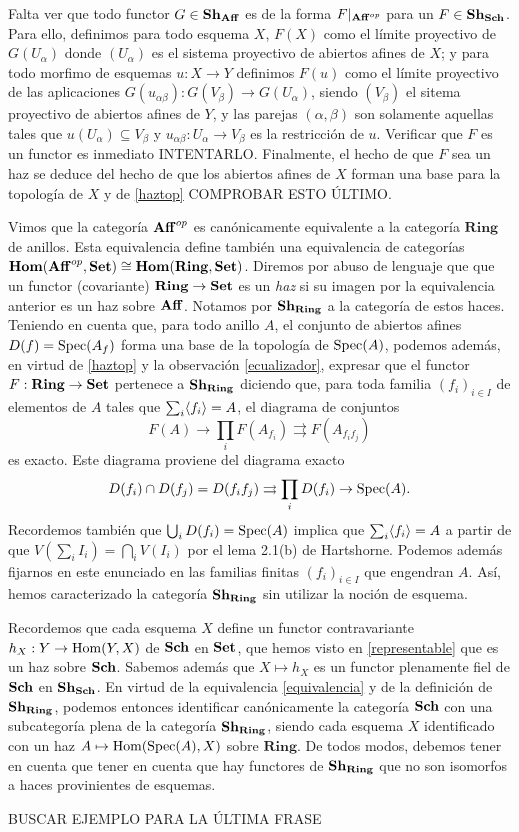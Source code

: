 \documentclass[twoside]{article}
\begin{document}
 Falta ver que todo functor $G\in\mathrm{\mathbf{Sh}}_{\mathrm{\mathbf{Aff}}}$ es de la forma $F|_{\mathrm{\mathbf{Aff}}^{op}}$ para un $F\in \mathrm{\mathbf{Sh}}_{\mathrm{\mathbf{Sch}}}$. Para ello, definimos para todo esquema $X$, $F(X)$ como el límite proyectivo de $G(U_\alpha)$ donde $(U_\alpha)$ es el sistema proyectivo de abiertos afines de $X$; y para todo morfimo de esquemas $u:X\to Y$ definimos $F(u)$ como el límite proyectivo de las aplicaciones $G(u_{\alpha\beta}):G(V_\beta)\to G(U_\alpha)$, siendo $(V_\beta)$ el sitema proyectivo de abiertos afines de $Y$, y las parejas $(\alpha,\beta)$ son solamente aquellas tales que $u(U_\alpha)\subseteq V_\beta$ y $u_{\alpha\beta}:U_\alpha\to V_\beta$ es la restricción de $u$. Verificar que $F$ es un functor es inmediato INTENTARLO. Finalmente, el hecho de que $F$ sea un haz se deduce del hecho de que los abiertos afines de $X$ forman una base para la topología de $X$ y de \ref{haztop} COMPROBAR ESTO ÚLTIMO.
 
 
 Vimos que la categoría $\mathrm{\mathbf{Aff}}^{op}$ es canónicamente equivalente a la categoría $\mathrm{\mathbf{Ring}}$ de anillos. Esta equivalencia define también una equivalencia de categorías $\mathrm{\mathbf{Hom}}(\mathrm{\mathbf{Aff}}^{op},\mathrm{\mathbf{Set}})\cong \mathrm{\mathbf{Hom}}(\mathrm{\mathbf{Ring}},\mathrm{\mathbf{Set}})$. Diremos por abuso de lenguaje que que un functor (covariante) $\mathrm{\mathbf{Ring}}\to\mathrm{\mathbf{Set}}$ es un \emph{haz} si su imagen por la equivalencia anterior es un haz sobre $\mathrm{\mathbf{Aff}}$. Notamos por $\mathrm{\mathbf{Sh}}_{\mathrm{\mathbf{Ring}}}$ a la categoría de estos haces. Teniendo en cuenta que, para todo anillo $A$, el conjunto de abiertos afines $D(f)=\operatorname{Spec}(A_f)$ forma una base de la topología de $\operatorname{Spec}(A)$, podemos además, en virtud de \ref{haztop} y la observación \ref{ecualizador}, expresar que el functor $F:\mathrm{\mathbf{Ring}}\to\mathrm{\mathbf{Set}}$ pertenece a $\mathrm{\mathbf{Sh}}_{\mathrm{\mathbf{Ring}}}$ diciendo que, para toda familia $(f_i)_{i\in I}$ de elementos de $A$ tales que $\sum_i \langle{f_i}\rangle=A$, el diagrama de conjuntos
 \[F(A)\to\prod_i F(A_{f_i})\rightrightarrows F(A_{f_if_j})\]
es exacto. Este diagrama proviene del diagrama exacto
\[
D(f_i)\cap D(f_j)=D(f_if_j)\rightrightarrows \prod_i D(f_i)\to \operatorname{Spec}(A).
\] 
Recordemos también que $\bigcup_i D(f_i)=\operatorname{Spec}(A)$ implica que $\sum_i\langle{f_i}\rangle=A$ a partir de que $V(\sum_i I_i)=\bigcap_i V(I_i)$ por el lema 2.1(b) de Hartshorne. Podemos además fijarnos en este enunciado en las familias finitas $(f_i)_{i\in I}$ que engendran $A$. %
Así, hemos caracterizado la categoría $\mathrm{\mathbf{Sh}}_{\mathrm{\mathbf{Ring}}}$ sin utilizar la noción de esquema. 


Recordemos que cada esquema $X$ define un functor contravariante $h_X:Y\to\operatorname{Hom}(Y,X)$ de $\mathrm{\mathbf{Sch}}$ en $\mathrm{\mathbf{Set}}$, que hemos visto en \ref{representable} que es un haz sobre $\mathrm{\mathbf{Sch}}$. Sabemos además que $X\mapsto h_X$ es un functor plenamente fiel de $\mathrm{\mathbf{Sch}}$ en $\mathrm{\mathbf{Sh}}_{\mathrm{\mathbf{Sch}}}$. En virtud de la equivalencia \ref{equivalencia} y de la definición de $\mathrm{\mathbf{Sh}}_{\mathrm{\mathbf{Ring}}}$, podemos entonces identificar canónicamente la categoría $\mathrm{\mathbf{Sch}}$ con una subcategoría plena de la categoría $\mathrm{\mathbf{Sh}}_{\mathrm{\mathbf{Ring}}}$, siendo cada esquema $X$ identificado con un haz $A\mapsto \operatorname{Hom}(\operatorname{Spec}(A),X)$ sobre $\mathrm{\mathbf{Ring}}$. De todos modos, debemos tener en cuenta que tener en cuenta que hay functores de $\mathrm{\mathbf{Sh}}_{\mathrm{\mathbf{Ring}}}$ que no son isomorfos a haces provinientes de esquemas. 
 
 BUSCAR EJEMPLO PARA LA ÚLTIMA FRASE
\end{document}
